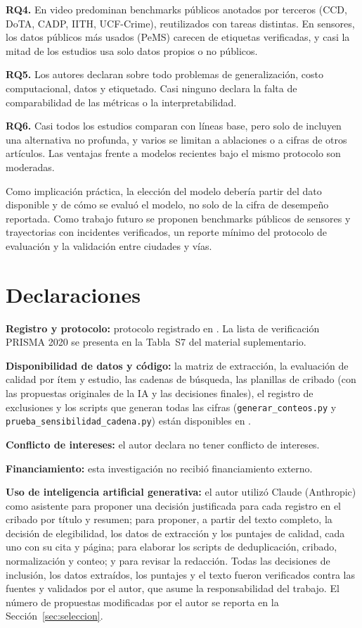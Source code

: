 \documentclass[12pt, a4paper]{article}
\begin{document}
\textbf{RQ4.} En video predominan benchmarks públicos anotados por terceros (CCD, DoTA, CADP, IITH, UCF-Crime), reutilizados con tareas distintas. En sensores, los datos públicos más usados (PeMS) carecen de etiquetas verificadas, y casi la mitad de los estudios usa solo datos propios o no públicos.

\textbf{RQ5.} Los autores declaran sobre todo problemas de generalización, costo computacional, datos y etiquetado. Casi ninguno declara la falta de comparabilidad de las métricas o la interpretabilidad.

\textbf{RQ6.} Casi todos los estudios comparan con líneas base, pero solo \NbaselineNoDL{} de \Nestudios{} incluyen una alternativa no profunda, y varios se limitan a ablaciones o a cifras de otros artículos. Las ventajas frente a modelos recientes bajo el mismo protocolo son moderadas.

Como implicación práctica, la elección del modelo debería partir del dato disponible y de cómo se evaluó el modelo, no solo de la cifra de desempeño reportada. Como trabajo futuro se proponen benchmarks públicos de sensores y trayectorias con incidentes verificados, un reporte mínimo del protocolo de evaluación y la validación entre ciudades y vías.

\section*{Declaraciones}

\textbf{Registro y protocolo:} protocolo registrado en \RegistroOSF. La lista de verificación PRISMA 2020 se presenta en la Tabla~S7 del material suplementario.

\textbf{Disponibilidad de datos y código:} la matriz de extracción, la evaluación de calidad por ítem y estudio, las cadenas de búsqueda, las planillas de cribado (con las propuestas originales de la IA y las decisiones finales), el registro de exclusiones y los scripts que generan todas las cifras (\texttt{generar\_conteos.py} y \texttt{prueba\_sensibilidad\_cadena.py}) están disponibles en \RepositorioDatos.

\textbf{Conflicto de intereses:} el autor declara no tener conflicto de intereses.

\textbf{Financiamiento:} esta investigación no recibió financiamiento externo.

\textbf{Uso de inteligencia artificial generativa:} el autor utilizó Claude (Anthropic) como asistente para proponer una decisión justificada para cada registro en el cribado por título y resumen; para proponer, a partir del texto completo, la decisión de elegibilidad, los datos de extracción y los puntajes de calidad, cada uno con su cita y página; para elaborar los scripts de deduplicación, cribado, normalización y conteo; y para revisar la redacción. Todas las decisiones de inclusión, los datos extraídos, los puntajes y el texto fueron verificados contra las fuentes y validados por el autor, que asume la responsabilidad del trabajo. El número de propuestas modificadas por el autor se reporta en la Sección~\ref{sec:seleccion}.
\end{document}
